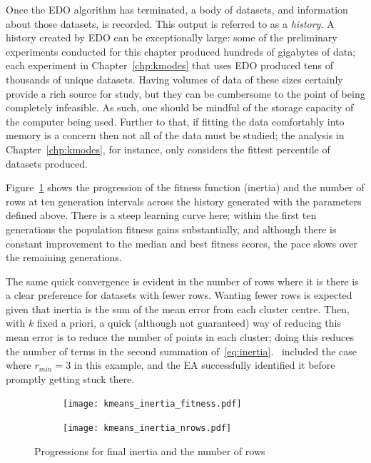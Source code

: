 Once the EDO algorithm has terminated, a body of datasets, and information about
those datasets, is recorded. This output is referred to as a \emph{history}. A
history created by EDO can be exceptionally large: some of the preliminary
experiments conducted for this chapter produced hundreds of gigabytes of data;
each experiment in Chapter~\ref{chp:kmodes} that uses EDO produced tens of
thousands of unique datasets. Having volumes of data of these sizes certainly
provide a rich source for study, but they can be cumbersome to the point of
being completely infeasible. As such, one should be mindful of the storage
capacity of the computer being used. Further to that, if fitting the data
comfortably into memory is a concern then not all of the data must be studied;
the analysis in Chapter~\ref{chp:kmodes}, for instance, only considers the
fittest percentile of datasets produced.

Figure~\ref{fig:inertia_progression} shows the progression of the fitness
function (inertia) and the number of rows at ten generation intervals across the
history generated with the parameters defined above. There is a steep learning
curve here; within the first ten generations the population fitness gains
substantially, and although there is constant improvement to the median and best
fitness scores, the pace slows over the remaining generations.

The same quick convergence is evident in the number of rows where it is there is
a clear preference for datasets with fewer rows. Wanting fewer rows is
expected given that inertia is the sum of the mean error from each cluster
centre. Then, with \(k\) fixed a priori, a quick (although not guaranteed) way
of reducing this mean error is to reduce the number of points in each cluster;
doing this reduces the number of terms in the second summation
of~\eqref{eq:inertia}.~\cite{Wilde2020:edo} included the case where
\(r_{min}=3\) in this example, and the EA successfully identified it before
promptly getting stuck there.

\begin{figure}
    \centering
    \begin{subfigure}{\imgwidth}
        \texttt{[image: kmeans\_inertia\_fitness.pdf]}%
    \end{subfigure}

    \begin{subfigure}{\imgwidth}
        \texttt{[image: kmeans\_inertia\_nrows.pdf]}%
    \end{subfigure}
    \caption{%
        Progressions for final inertia and the number of rows
    }\label{fig:inertia_progression}
\end{figure}

